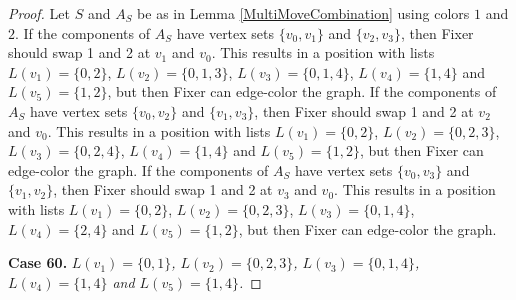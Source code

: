 \documentclass[12pt]{amsart}
\theoremstyle{plain}
\theoremstyle{definition}
\theoremstyle{remark}
\begin{document}
\begin{proof}
Let $S$ and $A_S$ be as in Lemma \ref{MultiMoveCombination} using colors $1$ and $2$. If the components of $A_S$ have vertex sets $\{v_0, v_1\}$ and $\{v_2, v_3\}$, then Fixer should swap 1 and 2 at $v_1$ and $v_0$. This results in a position with lists $L(v_1) = \{0, 2\}$, $L(v_2) = \{0, 1, 3\}$, $L(v_3) = \{0, 1, 4\}$, $L(v_4) = \{1, 4\}$ and $L(v_5) = \{1, 2\}$, but then Fixer can edge-color the graph.
If the components of $A_S$ have vertex sets $\{v_0, v_2\}$ and $\{v_1, v_3\}$, then Fixer should swap 1 and 2 at $v_2$ and $v_0$. This results in a position with lists $L(v_1) = \{0, 2\}$, $L(v_2) = \{0, 2, 3\}$, $L(v_3) = \{0, 2, 4\}$, $L(v_4) = \{1, 4\}$ and $L(v_5) = \{1, 2\}$, but then Fixer can edge-color the graph.
If the components of $A_S$ have vertex sets $\{v_0, v_3\}$ and $\{v_1, v_2\}$, then Fixer should swap 1 and 2 at $v_3$ and $v_0$. This results in a position with lists $L(v_1) = \{0, 2\}$, $L(v_2) = \{0, 2, 3\}$, $L(v_3) = \{0, 1, 4\}$, $L(v_4) = \{2, 4\}$ and $L(v_5) = \{1, 2\}$, but then Fixer can edge-color the graph.

\noindent\textbf{Case 60.  }\textit{$L(v_1) = \{0, 1\}$, $L(v_2) = \{0, 2, 3\}$, $L(v_3) = \{0, 1, 4\}$, $L(v_4) = \{1, 4\}$ and $L(v_5) = \{1, 4\}$.}


\end{proof}
\end{document}
